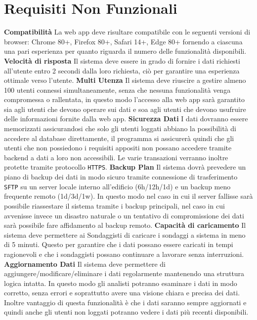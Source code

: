 \chapter{Requisiti Non Funzionali} 
    \begin{rnfList}
        \rnfItem \textbf{Compatibilità} La web app deve risultare compatibile con le seguenti versioni di browser: Chrome 80+, Firefox 80+, Safari 14+, Edge 80+ fornendo a ciascuna una pari esperienza per quanto riguarda il numero delle funzionalità disponibili.
        \rnfItem \textbf{Velocità di risposta} Il sistema deve essere in grado di fornire i dati richiesti all'utente entro 2 secondi dalla loro richiesta, ciò per garantire una esperienza ottimale verso l'utente.
        \rnfItem \textbf{Multi Utenza} Il sistema deve riuscire a gestire almeno 100 utenti connessi simultaneamente, senza che nessuna funzionalità venga compromessa o rallentata, in questo modo l'accesso alla web app sarà garantito sia agli utenti che devono operare sui dati e soa agli utenti che devono usufruire delle informazioni fornite dalla web app.
        \rnfItem \textbf{Sicurezza Dati} I dati dovranno essere memorizzati assicurandosi che solo gli utenti loggati abbiano la possibilità di accedere al database direttamente, il programma si assicurerà quindi che gli utenti che non possiedono i requisiti appositi non possano accedere tramite backend a dati a loro non accessibili. Le varie transazioni verranno inoltre protette tramite protocollo \texttt{HTTPS}.
        \rnfItem \textbf{Backup Plan} Il sistema dovrà prevedere un piano di backup dei dati in modo sicuro tramite connessione di trasferimento \texttt{SFTP} su un server locale interno all'edificio (6h/12h/1d) e un backup meno frequente remoto (1d/3d/1w). In questo modo nel caso in cui il server fallisse sarà possibile riassestare il sistema tramite i backup principali, nel caso in cui avvenisse invece un disastro naturale o un tentativo di compromissione dei dati sarà possibile fare affidamento al backup remoto.
        \rnfItem \textbf{Capacità di caricamento} Il sistema deve permettere ai Sondaggisti di caricare i sondaggi a sistema in meno di 5 minuti. Questo per garantire che i dati possano essere caricati in tempi ragionevoli e che i sondaggisti possano continuare a lavorare senza interruzioni.
        \rnfItem \textbf{Aggiornamento Dati} Il sistema deve permettere di aggiungere/modificare/eliminare i dati regolarmente mantenendo una struttura logica intatta. In questo modo gli analisti potranno esaminare i dati in modo corretto, senza errori e soprattutto avere una visione chiara e precisa dei dati. Inoltre vantaggio di questa funzionalità è che i dati saranno sempre aggiornati e quindi anche gli utenti non loggati potranno vedere i dati più recenti disponibili.

\end{rnfList}
